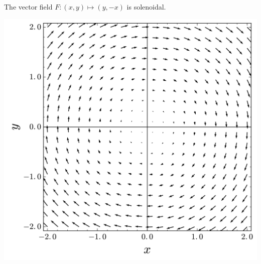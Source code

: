   \begin{example}
  The vector field $F: (x, y) \mapsto (y, -x)$ is solenoidal. 
  \begin{center}
      \includegraphics[scale=0.17]{img/Solenoidal_vector_field.png}
  \end{center}
  \end{example}

